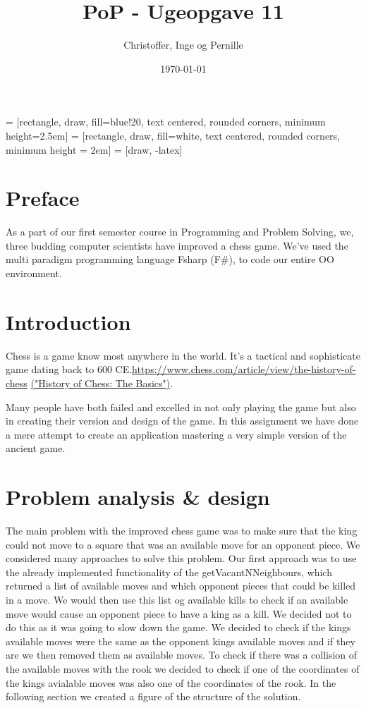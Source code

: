 \documentclass[a4paper]{report}
\title{PoP - Ugeopgave 11}
\author{Christoffer, Inge og Pernille}
\date{\today}
\begin{document}
\maketitle
{} = [rectangle, draw, fill=blue!20, text centered,
    rounded corners, minimum height=2.5em]
 = [rectangle, draw, fill=white, text centered,
    rounded corners, minimum height = 2em]
 = [draw, -latex]

\section*{Preface}
As a part of our first semester course in Programming and Problem Solving, we, three budding computer scientists have improved a chess game. We've used the multi paradigm programming language Fsharp (F\#), to code our entire OO environment.


\section*{Introduction}
Chess is a game know most anywhere in the world. It's a tactical and sophisticate game dating back to 600 CE.\url{https://www.chess.com/article/view/the-history-of-chess} \href{https://www.chess.com/article/view/the-history-of-chess}{(\textsf{"History of Chess: The Basics"})}.

Many people have both failed and excelled in not only playing the game but also in creating their version and design of the game.
In this assignment we have done a mere attempt to create an application mastering a very simple version of the ancient game.


\section*{Problem analysis \& design}
The main problem with the improved chess game was to make sure that the king could not move to a square that was an available move for an opponent piece. We considered many approaches to solve this problem.
Our first approach was to use the already implemented functionality of the getVacantNNeighbours, which returned a list of available moves and which opponent pieces that could be killed in a move. We
would then use this list og available kills to check if an available move would cause an opponent piece to have a king as a kill. We decided not to do this as it was going to slow down the game. We decided to
check if the kings available moves were the same as the opponent kings available moves and if they are we then removed them as available moves. To check if there was a collision of the available moves with the rook we
decided to check if one of the coordinates of the kings avialable moves was also one of the coordinates of the rook. In the following section we created a figure of the structure of the solution.
\end{document}
